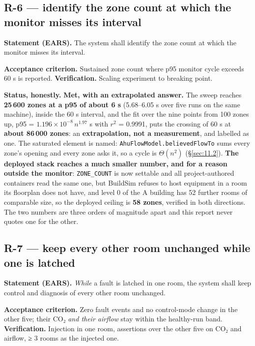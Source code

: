 \subsection{R-6 --- identify the zone count at which the monitor misses its interval}\label{sec:A.6}

\textbf{Statement (EARS).} The system shall identify the zone count at which the monitor misses its interval.

\textbf{Acceptance criterion.} Sustained zone count where p95 monitor cycle exceeds 60 s is reported. \quad \textbf{Verification.} Scaling experiment to
breaking point.

\textbf{Status, honestly.} \textbf{Met, with an extrapolated answer.} The sweep reaches \textbf{25\,600
zones at a p95 of about 6 s} (5.68–6.05 s over five runs on the same machine), inside the 60 s
interval, and the fit over the nine points from 100 zones up,
p95 = $1.196\times10^{-8}\,n^{1.97}$ s with $r^2$ = 0.9991, puts the crossing of 60 s at
\textbf{about 86\,000 zones}: an \textbf{extrapolation, not a measurement}, and labelled as one.
The saturated element is named: \texttt{AhuFlowModel.believedFlowTo} sums every zone's opening and
every zone asks it, so a cycle is $\Theta(n^2)$ (§\ref{sec:11.2}). \textbf{The deployed stack reaches a much
smaller number, and for a reason outside the monitor}: \texttt{ZONE\_COUNT} is now settable and all
\factAuthoredServices{} project-authored containers read the same one, but BuildSim refuses to host equipment in a
room its floorplan does not have, and level 0 of the A building has 52 further rooms of comparable
size, so the deployed ceiling is \textbf{58 zones}, verified in both directions. The two numbers
are three orders of magnitude apart and this report never quotes one for the other.

\subsection{R-7 --- keep every other room unchanged while one is latched}\label{sec:A.7}

\textbf{Statement (EARS).} \emph{While} a fault is latched in one room, the system shall keep control and diagnosis of
every other room unchanged.

\textbf{Acceptance criterion.} Zero fault events and no control-mode change in the other five;
their CO₂ \emph{and their airflow} stay within the healthy-run band. \quad \textbf{Verification.} Injection in one room,
assertions over the other five on CO₂ and airflow, ≥ 3 rooms as the injected one.

